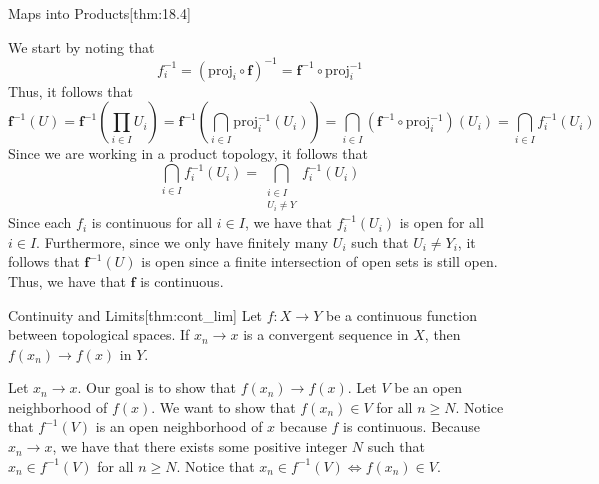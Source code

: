 \begin{thmBox}{Maps into Products}[thm:18.4]
\begin{proofBox}
        We start by noting that 
        \begin{equation*}
            f_{ i }^{ -1 }
            =
            ( \mathrm{proj}_{ i } \circ \mathbf{f} )^{ -1 }
            =
            \mathbf{f}^{ -1 } \circ \mathrm{proj}_{ i }^{ -1 }
        \end{equation*}
        Thus, it follows that 
        \begin{equation*}
            \mathbf{f}^{ -1 } ( U )
            =
            \mathbf{f}^{ -1 } \left( \prod_{ i \in I } U_{ i } \right)
            =
            \mathbf{f}^{ -1 } 
            \left( 
                \bigcap_{ i \in I } \mathrm{proj}_{ i }^{ -1 } ( U_{ i } ) 
            \right)
            =
            \bigcap_{ i \in I } 
            ( \mathbf{f}^{ -1 } \circ \mathrm{proj}_{ i }^{ -1 } ) ( U_{ i } ) 
            =
            \bigcap_{ i \in I }  f_{ i }^{ -1 } ( U_{ i } )
        \end{equation*}
        Since we are working in a product topology, it follows that 
        \begin{equation*}
            \bigcap_{ i \in I }  f_{ i }^{ -1 } ( U_{ i } )
            =
            \bigcap_{ \substack{ i \in I \\ U_{ i } \neq Y } } 
            f_{ i }^{ -1 } ( U_{ i } )
        \end{equation*}
        Since each \( f_{ i } \) is continuous for all \( i \in I \), we have
        that \( f_{ i }^{ -1 } ( U_{ i } ) \) is open for all \( i \in I \).
        Furthermore, since we only have finitely many \( U_{ i } \) such that
        \( U_{ i } \neq Y_{ i } \), it follows that 
        \( \mathbf{f}^{ -1 } ( U ) \) is 
        open since a finite intersection of open sets is still open.
        Thus, we have that \( \mathbf{f} \) is continuous.
    \end{proofBox}
\end{thmBox}

\begin{thmBox}{Continuity and Limits}[thm:cont_lim]
    Let \( f: X \rightarrow Y \) be a continuous function between topological
    spaces.
    If \( x_{ n } \rightarrow x \) is a convergent sequence in \( X \), then 
    \( f ( x_{ n } ) \rightarrow f ( x ) \) in \( Y \).

    \baseRule

    \begin{proofBox}
        Let \( x_{ n } \rightarrow x \).
        Our goal is to show that \( f ( x_{ n } ) \rightarrow f ( x ) \).
        Let \( V \) be an open neighborhood of \( f ( x ) \).
        We want to show that \( f ( x_{ n } ) \in V \) for all \( n \geq N \).
        Notice that \( f^{ -1 } ( V ) \) is an open neighborhood of \( x \)
        because \( f \) is continuous.
        Because \( x_{ n } \rightarrow x \), we have that there exists some 
        positive integer \( N \) such that \( x_{ n } \in f^{ -1 } ( V ) \) for all \( n \geq N \).
        Notice that \( x_{ n } \in f^{ -1 } ( V ) \iff f ( x_{ n } ) \in V \).
    \end{proofBox}
\end{thmBox}

